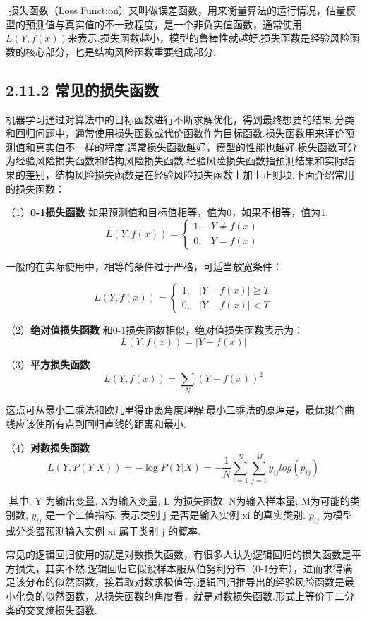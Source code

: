 ​ 损失函数（Loss
Function）又叫做误差函数，用来衡量算法的运行情况，估量模型的预测值与真实值的不一致程度，是一个非负实值函数，通常使用$
L(Y,
f(x))​$来表示.损失函数越小，模型的鲁棒性就越好.损失函数是经验风险函数的核心部分，也是结构风险函数重要组成部分.

\subsection{2.11.2
常见的损失函数}\label{ux5e38ux89c1ux7684ux635fux5931ux51fdux6570}

​
机器学习通过对算法中的目标函数进行不断求解优化，得到最终想要的结果.分类和回归问题中，通常使用损失函数或代价函数作为目标函数.
​
损失函数用来评价预测值和真实值不一样的程度.通常损失函数越好，模型的性能也越好.
​
损失函数可分为经验风险损失函数和结构风险损失函数.经验风险损失函数指预测结果和实际结果的差别，结构风险损失函数是在经验风险损失函数上加上正则项.
​ 下面介绍常用的损失函数：

（1）\textbf{0-1损失函数}
如果预测值和目标值相等，值为0，如果不相等，值为1. \[
L(Y, f(x)) =
\begin{cases}
1,& Y\ne f(x)\\
0,& Y = f(x)
\end{cases}
\]

一般的在实际使用中，相等的条件过于严格，可适当放宽条件：

\[
L(Y, f(x)) =
\begin{cases}
1,& |Y-f(x)|\geqslant T\\
0,& |Y-f(x)|< T
\end{cases}
\]

（2）\textbf{绝对值损失函数} 和0-1损失函数相似，绝对值损失函数表示为：
\[
L(Y, f(x)) = |Y-f(x)|​
\]

（3）\textbf{平方损失函数} \[
L(Y, f(x)) = \sum_N{(Y-f(x))}^2
\]

这点可从最小二乘法和欧几里得距离角度理解.最小二乘法的原理是，最优拟合曲线应该使所有点到回归直线的距离和最小.

（4）\textbf{对数损失函数} \[
L(Y, P(Y|X)) = -\log{P(Y|X)}=-\frac{1}{N}\sum_{i=1}^N\sum_{j=1}^M y_{ij}log(p_{ij})
\]

​ 其中, Y 为输出变量, X为输入变量, L 为损失函数. N为输入样本量,
M为可能的类别数, $y_{ij}$ 是一个二值指标, 表示类别 j 是否是输入实例 xi
的真实类别. $p_{ij}$ 为模型或分类器预测输入实例 xi 属于类别 j 的概率.

常见的逻辑回归使用的就是对数损失函数，有很多人认为逻辑回归的损失函数是平方损失，其实不然.逻辑回归它假设样本服从伯努利分布（0-1分布），进而求得满足该分布的似然函数，接着取对数求极值等.逻辑回归推导出的经验风险函数是最小化负的似然函数，从损失函数的角度看，就是对数损失函数.形式上等价于二分类的交叉熵损失函数.

